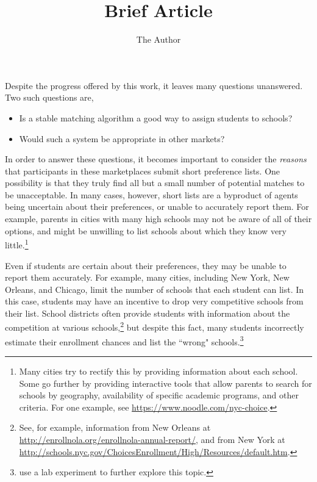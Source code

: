\documentclass[11pt, oneside]{article}   	%
\title{Brief Article}
\author{The Author}
\begin{document}
\maketitle

Despite the progress offered by this work, it leaves many questions unanswered. Two such questions are,
\begin{itemize}
\item Is a stable matching algorithm a good way to assign students to schools?
\item Would such a system be appropriate in other markets?
\end{itemize}

In order to answer these questions, it becomes important to consider the {\em reasons} that participants in these marketplaces submit short preference lists. One possibility is that they truly find all but a small number of potential matches to be unacceptable. In many cases, however, short lists are a byproduct of agents being uncertain about their preferences, or unable to accurately report them. For example, parents in cities with many high schools may not be aware of all of their options, and might be unwilling to list schools about which they know very little.\footnote{Many cities try to rectify this by providing information about each school. Some go further by providing interactive tools that allow parents to search for schools by geography, availability of specific academic programs, and other criteria. For one example, see  \url{https://www.noodle.com/nyc-choice}.} 

Even if students are certain about their preferences, they may be unable to report them accurately. For example, many cities, including New York, New Orleans, and Chicago, limit the number of schools that each student can list. In this case, students may have an incentive to drop very competitive schools from their list. School districts often provide students with information about the competition at various schools,\footnote{See, for example, information from New Orleans at \url{http://enrollnola.org/enrollnola-annual-report/}, and from New York at \url{http://schools.nyc.gov/ChoicesEnrollment/High/Resources/default.htm}.} but despite this fact, many students incorrectly estimate their enrollment chances and list the ``wrong" schools.\footnote{\cite{calsamiglia-haeringer-klijn_2010}  use a lab experiment to further explore this topic.}
\end{document}
